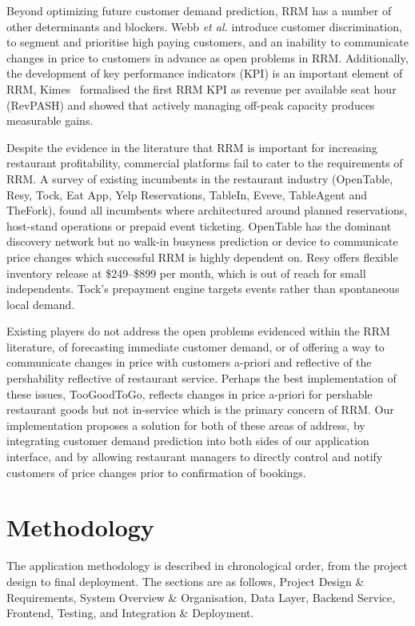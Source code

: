 \documentclass[conference]{IEEEtran}
\begin{document}
Beyond optimizing future customer demand prediction, RRM has a number of other determinants and blockers. Webb \textit{et al.} \cite{webb2023variable} introduce customer discrimination, to segment and prioritise high paying customers, and an inability to communicate changes in price to customers in advance as open problems in RRM.  Additionally, the development of key performance indicators (KPI) is an important element of RRM,  Kimes~\cite{kimes2004restaurant} formalised the first RRM KPI as revenue per available seat hour (RevPASH) and showed that actively managing off-peak capacity produces measurable gains.

Despite the evidence in the literature that RRM is important for increasing restaurant profitability, commercial platforms fail to cater to the requirements of RRM. A survey of existing incumbents in the restaurant industry (OpenTable, Resy, Tock, Eat App, Yelp Reservations, TableIn, Eveve, TableAgent and TheFork), found all incumbents where architectured around planned reservations, host-stand operations or prepaid event ticketing. OpenTable has the dominant discovery network but no walk-in busyness prediction or device to communicate price changes which successful RRM is highly dependent on. Resy offers flexible inventory release at \$249--\$899 per month, which is out of reach for small independents.  Tock's prepayment engine targets events rather than spontaneous local demand.

Existing players do not address the open problems evidenced within the RRM literature, of forecasting immediate customer demand, or of offering a way to communicate changes in price with customers a-priori and reflective of the pershability reflective of restaurant service. Perhaps the best implementation of these issues, TooGoodToGo, reflects changes in price a-priori for pershable restaurant goods but not in-service which is the primary concern of RRM. Our implementation proposes a solution for both of these areas of address, by integrating customer demand prediction into both sides of our application interface, and by allowing restaurant managers to directly control and notify customers of price changes prior to confirmation of bookings.

\section{Methodology}
The application methodology is described in chronological order, from the project design to final deployment. The sections are as follows, Project Design \& Requirements, System Overview \& Organisation, Data Layer, Backend Service, Frontend, Testing, and Integration \& Deployment.
\end{document}
